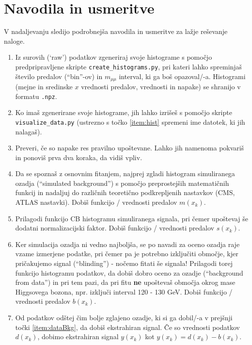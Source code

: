 \documentclass[slovene,11pt,a4paper]{article}
\begin{document}
\section*{Navodila in usmeritve}
V nadaljevanju sledijo podrobnejša navodila in usmeritve za lažje reševanje naloge.
\begin{enumerate}
    \item \label{item:hist} Iz surovih (`raw') podatkov zgeneriraj svoje histograme s pomočjo predpripravljene skripte \texttt{create\_histograms.py}, pri kateri lahko spreminjaš število predalov (``bin''-ov) in $m_{\mu \mu}$ interval, ki ga boš opazoval/-a. Histogrami (mejne in sredinske $x$ vrednosti predalov, vrednosti in napake) se shranijo v formatu \texttt{.npz}.
    \item \label{item:visual} Ko imaš zgenerirane svoje histograme, jih lahko izrišeš s pomočjo skripte \texttt{visualize\_data.py} (ustrezno s točko \ref{item:hist} spremeni ime datotek, ki jih nalagaš).
    \item \label{item:error} Preveri, če so napake res pravilno upoštevane. Lahko jih namenoma pokvariš in ponoviš prva dva koraka, da vidiš vpliv.
    \item \label{item:simBkg} Da se spoznaš z osnovnim fitanjem, najprej zgladi histogram simuliranega ozadja (``simulated background'') s pomočjo preprostejših matematičnih funkcij in nadaljuj do različnih teoretično podkrepljenih nastavkov (CMS, ATLAS nastavki). Dobiš funkcijo / vrednosti predalov $m(x_k)$.
    \item \label{item:simSig} Prilagodi funkcijo CB histogramu simuliranega signala, pri čemer upoštevaj še dodatni normalizacijski faktor. Dobiš funkcijo / vrednosti predalov $s(x_k)$.
    \item \label{item:dataBkg} Ker simulacija ozadja ni vedno najboljša, se po navadi za oceno ozadja raje vzame izmerjene podatke, pri čemer pa je potrebno izključiti območje, kjer pričakujemo signal (``blinding'') - nočemo fitati še signala! Prilagodi torej funkcijo histogramu podatkov, da dobiš dobro oceno za ozadje (``background from data'') in pri tem pazi, da pri fitu \textbf{ne} upoštevaš območja okrog mase Higgsovega bozona, npr. izključi interval 120 - 130 GeV. Dobiš funkcijo / vrednosti predalov $b(x_k)$.
    \item \label{item:extSig} Od podatkov odštej čim bolje zglajeno ozadje, ki si ga dobil/-a v prejšnji točki \ref{item:dataBkg}, da dobiš ekstrahiran signal. Če so vrednosti podatkov $d(x_k)$, dobimo ekstrahiran signal $y(x_k)$ kot $y(x_k) = d(x_k) - b(x_k)$.

\end{enumerate}
\end{document}
